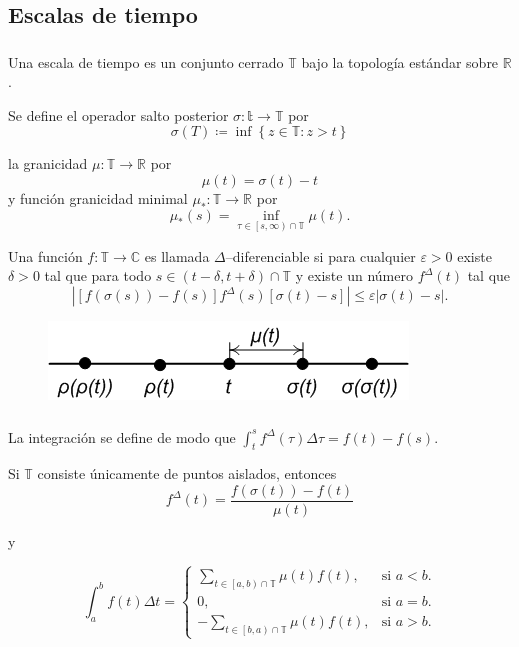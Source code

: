 \subsection{Escalas de tiempo}

\begin{frame}[t]
\frametitle{\subsecname}

Una escala de tiempo es un conjunto cerrado $\mathds{T}$ bajo la topología estándar sobre $\mathds{R}$.

Se define el operador salto posterior $\sigma\colon\mathds{t}\rightarrow\mathds{T}$ por \[ \sigma\left(T\right)\coloneqq\inf\left\{z\in\mathds{T}:z>t\right\} \]

la granicidad $\mu\colon\mathds{T}\rightarrow\mathds{R}$ por \[ \mu\left(t\right)=\sigma\left(t\right)-t \] y función granicidad minimal $\mu_{\ast}\colon\mathds{T}\rightarrow\mathds{R}$ por \[ \mu_{\ast}\left(s\right)=\inf_{\tau\in\left[s,\infty\right)\cap\mathds{T}}\mu\left(t\right). \]

Una función $f\colon\mathds{T}\rightarrow\mathds{C}$ es llamada $\Delta$--diferenciable si para cualquier $\varepsilon>0$ existe $\delta>0$ tal que para todo $s\in\left(t-\delta,t+\delta\right)\cap\mathds{T}$ y existe un número $f^{\Delta}\left(t\right)$ tal que \[ |\left[f\left(\sigma\left(s\right)\right)-f\left(s\right)\right]f^{\Delta}\left(s\right)\left[\sigma\left(t\right)-s\right]|\leq\varepsilon|\sigma\left(t\right)-s|. \]

\begin{figure}[H]
	\centering
	\includegraphics[width=0.4\paperwidth]{operators}
\end{figure}

\end{frame}

\begin{frame}
\frametitle{\subsecname}

La integración se define de modo que $\int_{t}^{s}f^{\Delta}\left(\tau\right)\Delta\tau=f\left(t\right)-f\left(s\right)$.

Si $\mathds{T}$ consiste únicamente de puntos aislados, entonces \[ f^{\Delta}\left(t\right)=\frac{f\left(\sigma\left(t\right)\right)-f\left(t\right)}{\mu\left(t\right)} \]

y

\[
\int_{a}^{b}f\left(t\right)\Delta t=
\begin{cases}
\sum_{t\in\left[a,b\right)\cap\mathds{T}}\mu\left(t\right)f\left(t\right),&\text{si }a<b.\\
0, & \text{si } a = b.\\
-\sum_{t\in\left[b,a\right)\cap\mathds{T}}\mu\left(t\right)f\left(t\right), & \text{si }a>b.
\end{cases}
\]
\end{frame}

